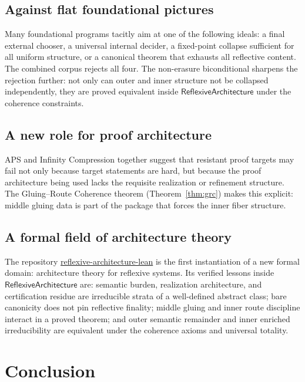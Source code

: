 \documentclass[11pt]{article}
\newcommand{\RAL}{\ensuremath{\mathsf{ReflexiveArchitecture}}}
\begin{document}
\subsection{Against flat foundational pictures}

Many foundational programs tacitly aim at one of the following ideals: a final external
chooser, a universal internal decider, a fixed-point collapse sufficient for all uniform
structure, or a canonical theorem that exhausts all reflective content.  The combined
corpus rejects all four.  The non-erasure biconditional sharpens the rejection further:
not only can outer and inner structure not be collapsed independently, they are proved
equivalent inside $\RAL$ under the coherence constraints.

\subsection{A new role for proof architecture}

APS and Infinity Compression together suggest that resistant proof targets may fail not
only because target statements are hard, but because the proof architecture being used
lacks the requisite realization or refinement structure.  The Gluing--Route Coherence
theorem (Theorem~\ref{thm:grc}) makes this explicit: middle gluing data is part of the
package that forces the inner fiber structure.

\subsection{A formal field of architecture theory}

The repository \url{reflexive-architecture-lean} is the first instantiation of a new
formal domain: architecture theory for reflexive systems.  Its verified lessons inside
$\RAL$ are: semantic burden, realization architecture, and certification residue are
irreducible strata of a well-defined abstract class; bare canonicity does not pin
reflective finality; middle gluing and inner route discipline interact in a proved
theorem; and outer semantic remainder and inner enriched irreducibility are equivalent
under the coherence axioms and universal totality.

\section{Conclusion}
\label{sec:conclusion}
\end{document}

